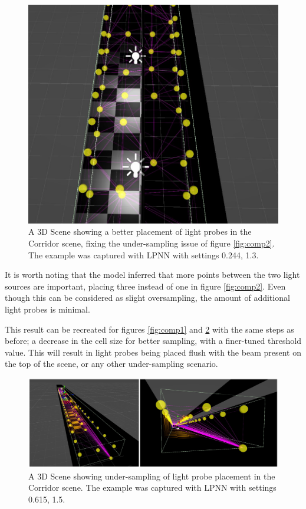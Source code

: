 \begin{figure}[h]
	\centering
	\includegraphics[scale=0.4]{Graphics/results/corridor_0.244_1.3.jpg}
	\caption{A 3D Scene showing a better placement of light probes in the Corridor scene, fixing the under-sampling issue of figure \ref{fig:comp2}. The example was captured with LPNN with settings 0.244, 1.3.}
	\label{fig:corr_1}
\end{figure}

It is worth noting that the model inferred that more points between the two light sources are important, placing three instead of one in figure \ref{fig:comp2}. Even though this can be considered as slight oversampling, the amount of additional light probes is minimal.

This result can be recreated for figures \ref{fig:comp1} and \ref{fig:comp3} with the same steps as before; a decrease in the cell size for better sampling, with a finer-tuned threshold value. This will result in light probes being placed flush with the beam present on the top of the scene, or any other under-sampling scenario.

\begin{figure}[h]
	\centering
	\includegraphics[width=\linewidth]{Graphics/results/concats/comparison3.png}
	\caption{A 3D Scene showing under-sampling of light probe placement in the Corridor scene. The example was captured with LPNN with settings 0.615, 1.5.}
	\label{fig:comp3}
\end{figure}

